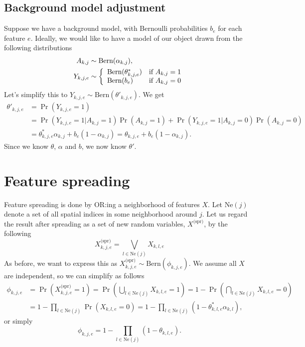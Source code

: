 \documentclass{article}
\newcommand{\Bern}[1]{\text{Bern}(#1)}
\begin{document}
\subsection{Background model adjustment}
Suppose we have a background model, with Bernoulli probabilities $b_e$ for each feature $e$. Ideally, we would like to have a model of our object drawn from the following distributions
\begin{align*}
    A_{k,j} & \sim \Bern{\alpha_{k,j}}, \\
    Y_{k,j,e} & \sim \left\{
        \begin{array}{l l}
            \Bern{\theta^*_{k,j,e}} & \text{if }A_{k,j} = 1  \\
            \Bern{b_e} & \text{if }A_{k,j} = 0 
        \end{array} \right.
\end{align*}
Let's simplify this to $Y_{k,j,e} \sim \Bern{\theta'_{k,j,e}}$. We get
\begin{align*}
    \theta'_{k,j,e} &= \Pr(Y_{k,j,e} = 1) \\
        &= \Pr(Y_{k,j,e}  = 1| A_{k,j} = 1) \Pr(A_{k,j} = 1) + \Pr(Y_{k,j,e} = 1| A_{k,j} = 0) \Pr(A_{k,j} = 0) \\
        &= \theta^*_{k,j,e} \alpha_{k,j} + b_e (1 - \alpha_{k,j}) = \theta_{k,j,e} + b_e (1 - \alpha_{k,j}).
\end{align*}
Since we know $\theta$, $\alpha$ and $b$, we now know $\theta'$.




\section{Feature spreading}
\newcommand{\neigh}[1]{\text{Ne}(#1)}
\newcommand{\Ne}{\text{Ne}}
\newcommand{\spr}[1]{#1^{\text{(spr)}}}

Feature spreading is done by OR:ing a neighborhood of features $X$. Let $\neigh{j}$ denote a set of all spatial indices in some neighborhood around $j$. Let us regard the result after spreading as a set of new random variables, $\spr{X}$, by the following
\[
    \spr{X}_{k,j,e} = \bigvee_{l \in \neigh{j}} X_{k,l,e}
\]
As before, we want to express this as $\spr{X}_{k,j,e} \sim \Bern{\phi_{k,j,e}}$. We assume all $X$ are independent, so we can simplify as follows 
\begin{align*}
    \phi_{k,j,e} &= \Pr(\spr{X}_{k,j,e} = 1) = \Pr(\bigcup_{l \in \neigh{j}} X_{k,l,e} = 1) = 1 - \Pr(\bigcap_{l \in \neigh{j}} X_{k,l,e} = 0) \\
    &= 1 - \prod_{l \in \neigh{j}} \Pr(X_{k,l,e} = 0) = 1 - \prod_{l \in \neigh{j}} (1 - \theta^*_{k,l,e} \alpha_{k,l}),
\end{align*}
or simply
\[
    \phi_{k,j,e} = 1 - \prod_{l \in \neigh{j}} (1 - \theta_{k,l,e}).
\]
\end{document}
